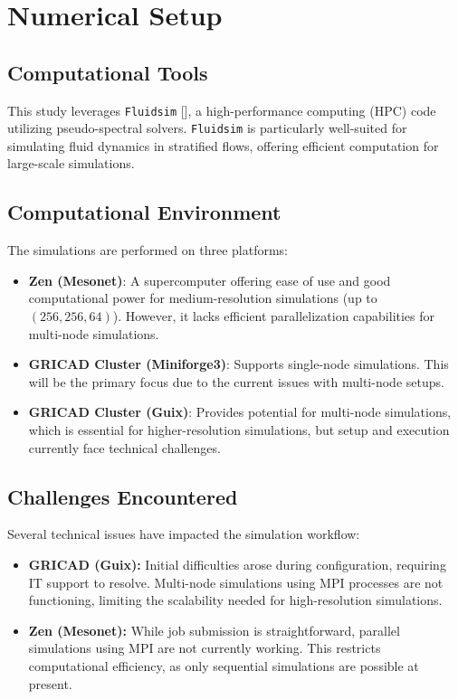 \documentclass[final,5p,times,twocolumn,authoryear]{elsarticle}
\begin{document}
\section{Numerical Setup}

\subsection{Computational Tools}

This study leverages \texttt{Fluidsim} [\cite{fluiddyn}], a high-performance computing (HPC) code utilizing pseudo-spectral solvers. \texttt{Fluidsim} is particularly well-suited for simulating fluid dynamics in stratified flows, offering efficient computation for large-scale simulations.

\subsection{Computational Environment}

The simulations are performed on three platforms: 

\begin{itemize}
    \item \textbf{Zen (Mesonet)}: A supercomputer offering ease of use and good computational power for medium-resolution simulations (up to $(256, 256, 64)$). However, it lacks efficient parallelization capabilities for multi-node simulations.
    \item \textbf{GRICAD Cluster (Miniforge3)}: Supports single-node simulations. This will be the primary focus due to the current issues with multi-node setups.
    \item \textbf{GRICAD Cluster (Guix)}: Provides potential for multi-node simulations, which is essential for higher-resolution simulations, but setup and execution currently face technical challenges.
\end{itemize}

\subsection{Challenges Encountered}

Several technical issues have impacted the simulation workflow:

\begin{itemize}
    \item \textbf{GRICAD (Guix):} Initial difficulties arose during configuration, requiring IT support to resolve. Multi-node simulations using MPI processes are not functioning, limiting the scalability needed for high-resolution simulations.
    \item \textbf{Zen (Mesonet):} While job submission is straightforward, parallel simulations using MPI are not currently working. This restricts computational efficiency, as only sequential simulations are possible at present.
\end{itemize}
\end{document}
